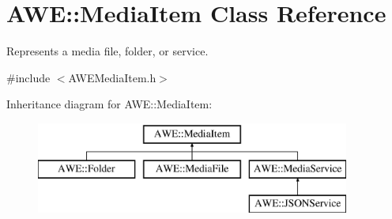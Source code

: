 \hypertarget{class_a_w_e_1_1_media_item}{\section{A\-W\-E\-:\-:Media\-Item Class Reference}
\label{class_a_w_e_1_1_media_item}
}


Represents a media file, folder, or service.  




{\ttfamily \#include $<$A\-W\-E\-Media\-Item.\-h$>$}

Inheritance diagram for A\-W\-E\-:\-:Media\-Item\-:\begin{figure}[H]
\begin{center}
\leavevmode
\includegraphics[height=3.000000cm]{class_a_w_e_1_1_media_item}
\end{center}
\end{figure}

